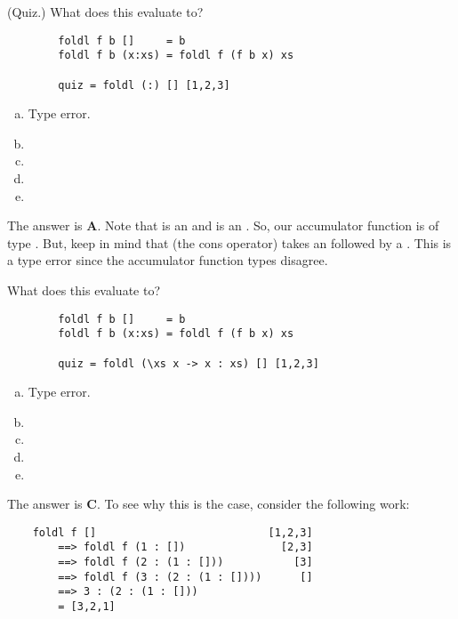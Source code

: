\documentclass[letterpaper]{article}
\begin{document}
\begin{mdframed}[nobreak=true]
    (Quiz.) What does this evaluate to? 
    \begin{verbatim}
        foldl f b []     = b
        foldl f b (x:xs) = foldl f (f b x) xs

        quiz = foldl (:) [] [1,2,3]\end{verbatim}
    \begin{enumerate}[(a)]
        \item Type error.
        \item \code{[1, 2, 3]}
        \item \code{[3, 2, 1]}
        \item \code{[[3], [2], [1]]}
        \item \code{[[1], [2], [3]]}
    \end{enumerate}

    \begin{mdframed}[]
        The answer is \textbf{A}. Note that  is an  and  is an \code{[Int]}. So, our accumulator function is of type . But, keep in mind that \code{(:)} (the cons operator) takes an  followed by a \code{[Int]}. This is a type error since the accumulator function types disagree. 
    \end{mdframed}
\end{mdframed}

\begin{mdframed}[nobreak=true]
    What does this evaluate to? 
    \begin{verbatim}
        foldl f b []     = b
        foldl f b (x:xs) = foldl f (f b x) xs

        quiz = foldl (\xs x -> x : xs) [] [1,2,3]
    \end{verbatim}

    \begin{enumerate}[(a)]
        \item Type error. 
        \item \code{[1,2,3]}
        \item \code{[3,2,1]}
        \item \code{[[3], [2], [1]]}
        \item \code{[[1],[2],[3]]}
    \end{enumerate}

    \begin{mdframed}[]
        The answer is \textbf{C}. To see why this is the case, consider the following work: 
        \begin{verbatim}
    foldl f []                           [1,2,3]
        ==> foldl f (1 : [])               [2,3]
        ==> foldl f (2 : (1 : []))           [3]
        ==> foldl f (3 : (2 : (1 : [])))      []
        ==> 3 : (2 : (1 : []))
        = [3,2,1]\end{verbatim}
    \end{mdframed}
\end{mdframed}
\end{document}
